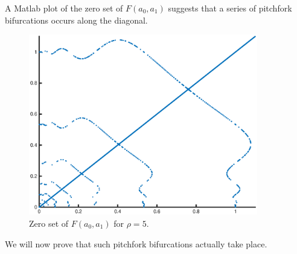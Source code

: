 \documentclass[12pt]{article}
\begin{document}
A Matlab plot of the zero set of $F(a_0, a_1)$ suggests that a series of pitchfork bifurcations occurs along the diagonal.

\begin{figure}[H]
\label{fig:Fzeronumeric}
\includegraphics[width=10cm]{zeroset5.eps}
\caption{Zero set of $F(a_0, a_1)$ for $\rho = 5$.}
\end{figure}

We will now prove that such pitchfork bifurcations actually take place.

\end{document}
